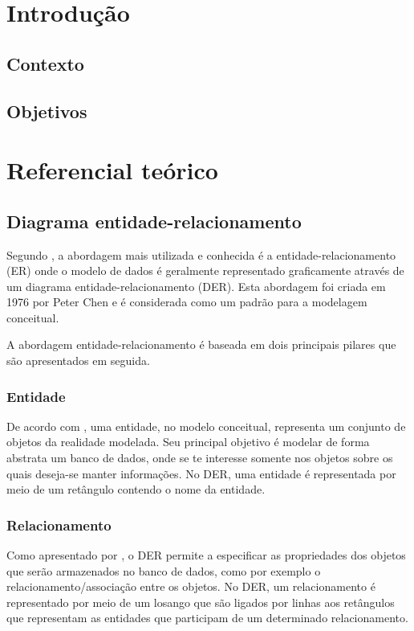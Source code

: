 \chapter[Introdução]{Introdução}

\section{Contexto}

\section{Objetivos}

\chapter{Referencial teórico}

\section{Diagrama entidade-relacionamento}
Segundo  , a abordagem mais utilizada e conhecida é a 
entidade-relacionamento (ER) onde o modelo de dados é geralmente representado graficamente através
de um diagrama entidade-relacionamento (DER). Esta abordagem foi criada em 1976 por Peter Chen e
é considerada como um padrão para a modelagem conceitual.

A abordagem entidade-relacionamento é baseada em dois principais pilares que são apresentados em seguida.

\subsection{Entidade}
De acordo com , uma entidade, no modelo conceitual, representa um conjunto
de objetos da realidade modelada. Seu principal objetivo é modelar de forma abstrata um banco de dados, onde
se te interesse somente nos objetos sobre os quais deseja-se manter informações. No DER, uma entidade é representada
por meio de um retângulo contendo o nome da entidade.
 
\subsection{Relacionamento}
Como apresentado por , o DER permite a especificar as propriedades dos objetos
que serão armazenados no banco de dados, como por exemplo o relacionamento/associação entre os objetos. No DER,
um relacionamento é representado por meio de um losango que são ligados por linhas aos retângulos que representam
as entidades que participam de um determinado relacionamento.

